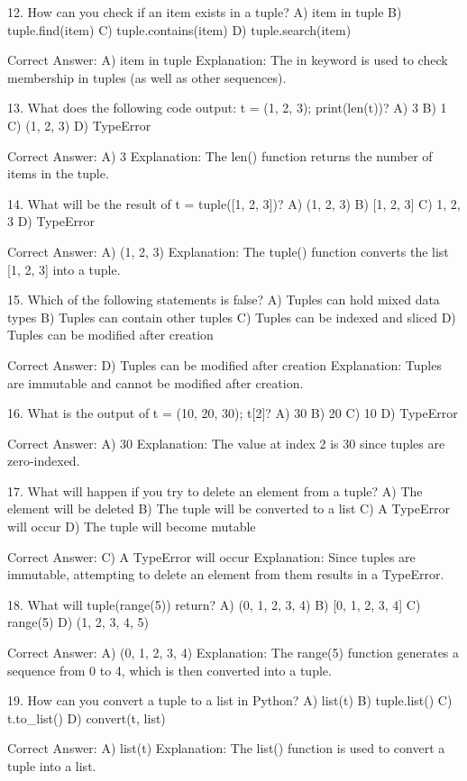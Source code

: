 12. How can you check if an item exists in a tuple?
A) item in tuple
B) tuple.find(item)
C) tuple.contains(item)
D) tuple.search(item)

Correct Answer: A) item in tuple
Explanation: The in keyword is used to check membership in tuples (as well as other sequences).

13. What does the following code output: t = (1, 2, 3); print(len(t))?
A) 3
B) 1
C) (1, 2, 3)
D) TypeError

Correct Answer: A) 3
Explanation: The len() function returns the number of items in the tuple.

14. What will be the result of t = tuple([1, 2, 3])?
A) (1, 2, 3)
B) [1, 2, 3]
C) 1, 2, 3
D) TypeError

Correct Answer: A) (1, 2, 3)
Explanation: The tuple() function converts the list [1, 2, 3] into a tuple.

15. Which of the following statements is false?
A) Tuples can hold mixed data types
B) Tuples can contain other tuples
C) Tuples can be indexed and sliced
D) Tuples can be modified after creation

Correct Answer: D) Tuples can be modified after creation
Explanation: Tuples are immutable and cannot be modified after creation.

16. What is the output of t = (10, 20, 30); t[2]?
A) 30
B) 20
C) 10
D) TypeError

Correct Answer: A) 30
Explanation: The value at index 2 is 30 since tuples are zero-indexed.

17. What will happen if you try to delete an element from a tuple?
A) The element will be deleted
B) The tuple will be converted to a list
C) A TypeError will occur
D) The tuple will become mutable

Correct Answer: C) A TypeError will occur
Explanation: Since tuples are immutable, attempting to delete an element from them results in a TypeError.

18. What will tuple(range(5)) return?
A) (0, 1, 2, 3, 4)
B) [0, 1, 2, 3, 4]
C) range(5)
D) (1, 2, 3, 4, 5)

Correct Answer: A) (0, 1, 2, 3, 4)
Explanation: The range(5) function generates a sequence from 0 to 4, which is then converted into a tuple.

19. How can you convert a tuple to a list in Python?
A) list(t)
B) tuple.list()
C) t.to_list()
D) convert(t, list)

Correct Answer: A) list(t)
Explanation: The list() function is used to convert a tuple into a list.

